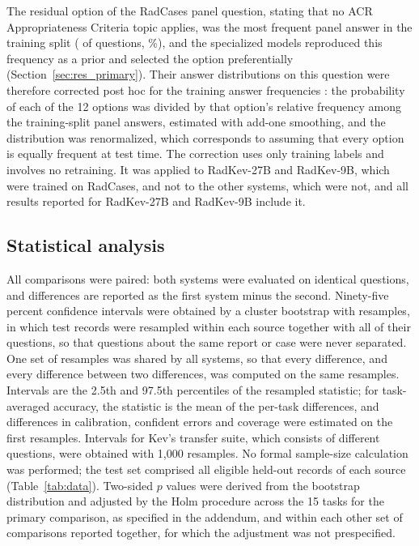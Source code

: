 \documentclass[11pt]{article}
\begin{document}
The residual option of the RadCases panel question, stating that no ACR Appropriateness Criteria topic applies, was the most frequent panel answer in the training split ( of  questions, \%), and the specialized models reproduced this frequency as a prior and selected the option preferentially (Section~\ref{sec:res_primary}). Their answer distributions on this question were therefore corrected post hoc for the training answer frequencies \citep{saerens2002adjusting}: the probability of each of the 12 options was divided by that option's relative frequency among the training-split panel answers, estimated with add-one smoothing, and the distribution was renormalized, which corresponds to assuming that every option is equally frequent at test time. The correction uses only training labels and involves no retraining. It was applied to RadKev-27B and RadKev-9B, which were trained on RadCases, and not to the other systems, which were not, and all results reported for RadKev-27B and RadKev-9B include it.

\FloatBarrier
\subsection{Statistical analysis}\label{sec:stats}

All comparisons were paired: both systems were evaluated on identical questions, and differences are reported as the first system minus the second. Ninety-five percent confidence intervals were obtained by a cluster bootstrap \citep{efron1993bootstrap} with  resamples, in which test records were resampled within each source together with all of their questions, so that questions about the same report or case were never separated. One set of resamples was shared by all systems, so that every difference, and every difference between two differences, was computed on the same resamples. Intervals are the 2.5th and 97.5th percentiles of the resampled statistic; for task-averaged accuracy, the statistic is the mean of the per-task differences, and differences in calibration, confident errors and coverage were estimated on the first  resamples. Intervals for Kev's transfer suite, which consists of different questions, were obtained with 1,000 resamples. No formal sample-size calculation was performed; the test set comprised all eligible held-out records of each source (Table~\ref{tab:data}). Two-sided $p$ values were derived from the bootstrap distribution and adjusted by the Holm procedure \citep{holm1979simple} across the 15 tasks for the primary comparison, as specified in the addendum, and within each other set of comparisons reported together, for which the adjustment was not prespecified.
\end{document}
